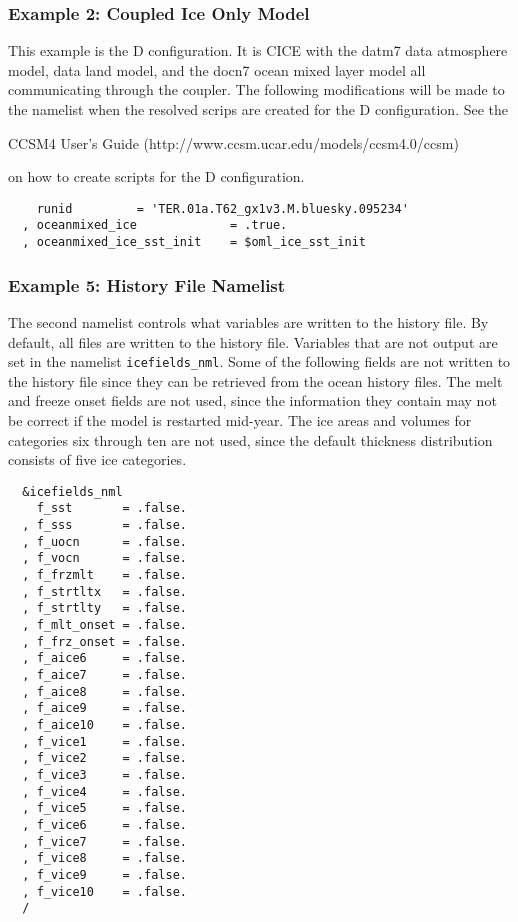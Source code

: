 \subsubsection {Example 2: Coupled Ice Only Model}
\label{example2_nml}

This example is the D configuration.  It is CICE with the datm7 data
atmosphere model, data land model, and the docn7 ocean mixed layer model
all communicating through the coupler.  The 
following modifications will be made to the namelist when the resolved
scrips are created for the D configuration.  See the 
\begin{htmlonly}
\end{htmlonly}
\begin{latexonly}
  CCSM4 User's Guide (http://www.ccsm.ucar.edu/models/ccsm4.0/ccsm)
\end{latexonly}
on how to create scripts for the D configuration.

\begin{verbatim}
    runid         = 'TER.01a.T62_gx1v3.M.bluesky.095234'
  , oceanmixed_ice             = .true.
  , oceanmixed_ice_sst_init    = $oml_ice_sst_init
\end{verbatim}

\subsubsection {Example 5: History File Namelist}
\label{example5_nml}

The second namelist controls what variables are written to the history file.
By default, all files are written to the history file.  Variables that
are not output are set in the namelist {\tt icefields\_nml}.
Some of the following fields are not written to the history file since
they can be retrieved from the ocean history files.  The melt and freeze
onset fields are not used, since the information they contain may not
be correct if the model is restarted mid-year.  The ice areas and volumes
for categories six through ten are not used, since the default thickness
distribution consists of five ice categories.

\begin{verbatim}
  &icefields_nml
    f_sst       = .false.
  , f_sss       = .false.
  , f_uocn      = .false.
  , f_vocn      = .false.
  , f_frzmlt    = .false.
  , f_strtltx   = .false.
  , f_strtlty   = .false.
  , f_mlt_onset = .false.
  , f_frz_onset = .false.
  , f_aice6     = .false.
  , f_aice7     = .false.
  , f_aice8     = .false.
  , f_aice9     = .false.
  , f_aice10    = .false.
  , f_vice1     = .false.
  , f_vice2     = .false.
  , f_vice3     = .false.
  , f_vice4     = .false.
  , f_vice5     = .false.
  , f_vice6     = .false.
  , f_vice7     = .false.
  , f_vice8     = .false.
  , f_vice9     = .false.
  , f_vice10    = .false.
  /
\end{verbatim}
